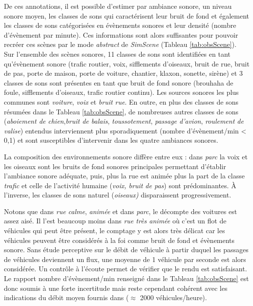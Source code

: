 

De ces annotations, il est possible d'estimer par ambiance sonore, un niveau sonore moyen, les classes de sons qui caractérisent leur bruit de fond et également les classes de sons catégorisées en évènements sonores et leur densité (nombre d'évènement par minute). Ces informations sont alors suffisantes pour pouvoir recréer ces scènes par le mode \textit{abstract} de \textit{SimScene} (Tableau \ref{tab:obsScene}).\\

Sur l'ensemble des scènes sonores, 11 classes de sons sont identifiées en tant qu'évènement sonore (trafic routier, voix, sifflements d'oiseaux, bruit de rue, bruit de pas, porte de maison, porte de voiture, chantier, klaxon, sonette, sirène) et 3 classes de sons sont présentes en tant que bruit de fond sonore (brouhaha de foule, sifflements d'oiseaux, trafic routier continu).
Les sources sonores les plus communes sont \textit{voiture}, \textit{voix} et \textit{bruit rue}. En outre, en plus des classes de sons résumées dans le Tableau \ref{tab:obsScene}, de nombreuses autres classes de sons (\textit{aboiement de chien},\textit{bruit de balais}, \textit{toussotement}, \textit{passage d'avion}, \textit{roulement de valise}) entendus interviennent plus sporadiquement (nombre d'évènement/min < 0,1) et sont susceptibles d'intervenir dans les quatre ambiances sonores.

La composition des environnements sonore diffère entre eux : dans \textit{parc} la voix et les oiseaux sont les bruits de fond sonores principales permettant d'établir l'ambiance sonore adéquate, puis, plus la rue est animée plus la part de la classe \textit{trafic} et celle de l'activité humaine (\textit{voix, bruit de pas}) sont prédominantes. À l'inverse, les classes de sons \og naturel \fg{} (\textit{oiseaux)} disparaissent progressivement.

Notons que dans \textit{rue calme}, \textit{animée} et dans \textit{parc}, le décompte des voitures est assez aisé. Il l'est beaucoup moins dans \textit{rue très animée} où c'est un flot de véhicules qui peut être présent, le comptage y est alors très délicat car les véhicules peuvent être considérés à la foi comme bruit de fond et évènements sonore.
Sans étude perceptive sur le débit de véhicule à partir duquel les passages de véhicules deviennent un flux, une moyenne de 1 véhicule par seconde est alors considérée. Un contrôle à l'écoute permet de vérifier que le rendu est satisfaisant. Le rapport nombre d'évènement/min renseigné dans le Tableau \ref{tab:obsScene} est donc soumis à une forte incertitude mais reste cependant cohérent avec les indications du débit moyen fournis dans \cite{aumond2017modeling} ($\approx$ 2000 véhicules/heure). \\

